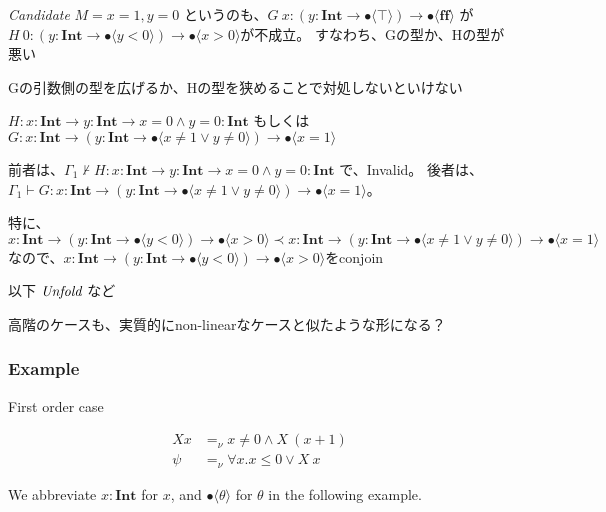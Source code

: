 \documentclass[runningheads]{llncs}
\newcommand\COL{\mathbin{:}}
\newcommand \false {\textbf{ff}}
\newcommand \stypeint {\textbf{Int}}
\newcommand \stypebool {\bullet}
\newcommand \typeint[1]{{#1} : \stypeint}
\newcommand \typebool[1]{\stypebool \langle #1 \rangle}
\newcommand {\rcandidate} {\emph{Candidate}}
\newcommand {\runfold} {\emph{Unfold}}
\begin{document}
\rcandidate{}
\(
M = x = 1, y = 0
\)
というのも、\( G\ x \COL (\typeint{y} \to \typebool{\top}) \to \typebool{\false} \) が \( H\ 0 \COL (\typeint{y} \to \typebool{y < 0}) \to \typebool{x > 0} \)が不成立。
すなわち、Gの型か、Hの型が悪い

Gの引数側の型を広げるか、Hの型を狭めることで対処しないといけない

\( H \COL \typeint{x} \to \typeint{y} \to \typeint{x = 0 \wedge y = 0} \)
もしくは
\( G \COL \typeint{x} \to (\typeint{y} \to \typebool{x \neq 1 \lor y \neq 0}) \to \typebool{x = 1} \)

前者は、\( \Gamma_1 \not \vdash H \COL \typeint{x} \to \typeint{y} \to \typeint{x = 0 \wedge y = 0} \) で、Invalid。
後者は、\( \Gamma_1 \vdash G \COL \typeint{x} \to (\typeint{y} \to \typebool{x \neq 1 \lor y \neq 0}) \to \typebool{x = 1} \)。

特に、\( \typeint{x} \to (\typeint{y} \to \typebool{y < 0}) \to \typebool{x > 0} \prec \typeint{x} \to (\typeint{y} \to \typebool{x \neq 1 \lor y \neq 0}) \to \typebool{x = 1} \) なので、\( \typeint{x} \to (\typeint{y} \to \typebool{y < 0}) \to \typebool{x > 0} \)をconjoin

以下 \( \runfold{} \) など

高階のケースも、実質的にnon-linearなケースと似たような形になる？

\subsubsection{Example}

First order case

\begin{align*}
    X x &=_\nu x \neq 0 \land X\ (x + 1) \\
    \psi  &=_\nu \forall x. x \leq 0 \lor X\ x
\end{align*}

We abbreviate \(\typeint{x}\) for \(x\), and \(\typebool{\theta}\) for
\(\theta\) in the following example.
\end{document}
